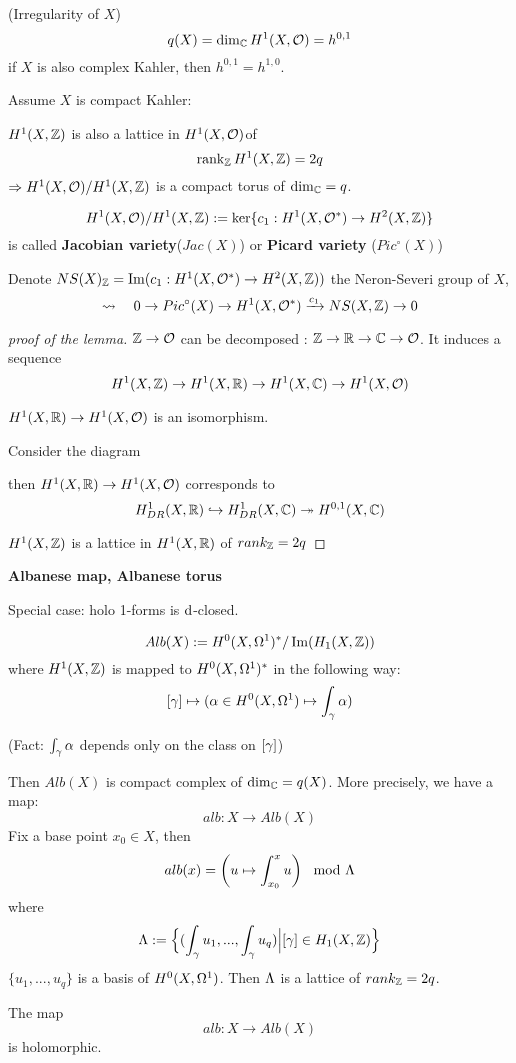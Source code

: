 \begin{definition}(Irregularity of $X$)
$$q(X)=\dim_{\mathbb{C}}H^1(X,\mathcal{O})
=h^{0,1}$$
if $X$ is also complex Kahler, then $h^{0,1}=h^{1,0}$.
\end{definition}

Assume $X$ is compact Kahler:

\begin{lemma}
$H^1(X,\mathbb{Z})$ is also a lattice in $H^1(X,\mathcal{O})$of
$$\operatorname{rank}_{\mathbb{Z}}H^1(X,\mathbb{Z})=2q$$
$\Rightarrow H^1(X,\mathcal{O})/H^1(X,\mathbb{Z})$ is a
compact torus of $\dim_{\mathbb{C}}=q$.
\end{lemma}
$$H^1(X,\mathcal{O})/H^1(X,\mathbb{Z}):=
\ker\{c_1:H^1(X,\mathcal{O}^*)\to H^2(X,\mathbb{Z})\}$$
is called \textbf{Jacobian variety}($Jac(X)$) or \textbf{Picard variety}
($Pic^\circ(X)$)

Denote $NS(X)_{\mathbb{Z}}=\operatorname{Im}(c_1:H^1(X,\mathcal{O}^*)\to H^2(X,\mathbb{Z}))$
the Neron-Severi group of $X$,
$$
  \rightsquigarrow\quad
  0\to Pic^\circ(X)\to H^1(X,\mathcal{O}^*)\xrightarrow{c_1}NS(X,\mathbb{Z})\to 0
$$

\begin{proof}[proof of the lemma]

$\mathbb{Z}\to\mathcal{O}$ can be decomposed : $\mathbb{Z}\to\mathbb{R}\to\mathbb{C}\to\mathcal{O}$.
It induces a sequence
$$H^1(X,\mathbb{Z})\to H^1(X,\mathbb{R})\to H^1(X,\mathbb{C})\to H^1(X,\mathcal{O})$$

$H^1(X,\mathbb{R})\to H^1(X,\mathcal{O})$ is an isomorphism.

Consider the diagram

then $H^1(X,\mathbb{R})\to H^1(X,\mathcal{O})$ corresponds to
$$
  H^1_{DR}(X,\mathbb{R})\hookrightarrow H^1_{DR}(X,\mathbb{C})\twoheadrightarrow H^{0,1}(X,\mathbb{C})
$$

$H^1(X,\mathbb{Z})$ is a lattice in $H^1(X,\mathbb{R})$ of $rank_{\mathbb{Z}}=2q$
\end{proof}

\textbf{Albanese map, Albanese torus}


Special case: holo 1-forms is $\mathrm{d}$-closed.

$$Alb(X):=H^0(X,\Omega^1)^*/\operatorname{Im}(H_1(X,\mathbb{Z}))$$
where $H^1(X,\mathbb{Z})$ is mapped to
$H^0(X,\Omega^1)^*$ in the following way:
$$[\gamma]\mapsto(\alpha\in H^0(X,\Omega^1)\mapsto\int_\gamma\alpha)$$

(Fact: $\int_\gamma\alpha$ depends only on the class on $[\gamma]$)

Then $Alb(X)$ is compact complex of $\dim_{\mathbb{C}}=q(X)$.
More precisely, we have a map:
$$alb: X\to Alb(X)$$
Fix a base point $x_0\in X$, then
$$alb(x)=
\left(
  u\mapsto
  \int_{x_0}^x u
\right)\mod{\Lambda}
$$
where
$$\Lambda:=\Big\{ (\int_\gamma u_1,...,\int_\gamma u_q) \Big| [\gamma]\in H_1(X,\mathbb{Z}) \Big\}$$
$\{u_1,...,u_q\}$ is a basis of $H^0(X,\Omega^1)$.
Then $\Lambda$ is a lattice of $rank_{\mathbb{Z}}=2q$.

The map
$$alb: X\to Alb(X)$$
is holomorphic.







